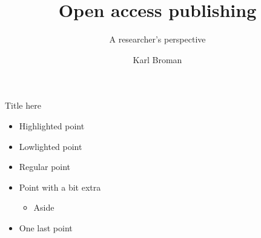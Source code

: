 \documentclass[12pt]{beamer}
\title{Open access publishing}
\subtitle{\textcolor{subtitle}{A researcher's perspective}}
\author{Karl Broman}
\institute{\textcolor{gray}{Biostatistics \& Medical Informatics \\[2pt] University of Wisconsin{\textendash}Madison}}
\date{}
\begin{document}
{
\frame{\titlepage}
}



\begin{frame}{Title here}
\begin{itemize}
\item {\color{hilight} Highlighted point}
\item {\color{lolight} Lowlighted point}
\item Regular point
\item Point with a bit extra

\begin{itemize}
\item Aside
\end{itemize}

\item One last point
\end{itemize}
\end{frame}
\end{document}
